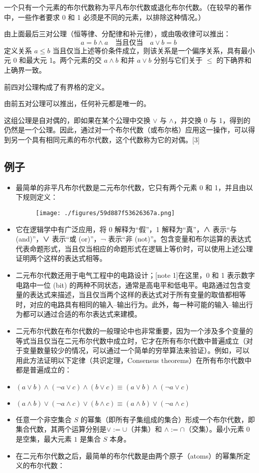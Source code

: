 一个只有一个元素的布尔代数称为平凡布尔代数或退化布尔代数。（在较早的著作中，一些作者要求 0 和 1 必须是不同的元素，以排除这种情况。）

由上面最后三对公理（恒等律、分配律和补元律），或由吸收律可以推出：
$$
a = b \land a \quad \text{当且仅当} \quad a \lor b = b~
$$
定义关系 $a \le b$ 当且仅当上述等价条件成立，则该关系是一个偏序关系，具有最小元 0 和最大元 1。两个元素的交 $a \land b$ 和并 $a \lor b$ 分别与它们关于 $\le$ 的下确界和上确界一致。

前四对公理构成了有界格的定义。

由前五对公理可以推出，任何补元都是唯一的。

这组公理是自对偶的，即如果在某个公理中交换 $\lor$ 与 $\land$，并交换 0 与 1，得到的仍然是一个公理。因此，通过对一个布尔代数（或布尔格）应用这一操作，可以得到另一个具有相同元素的布尔代数，这个代数称为它的对偶。[3]
\subsection{例子}
\begin{itemize}
\item 最简单的非平凡布尔代数是二元布尔代数，它只有两个元素 0 和 1，并且由以下规则定义：
\begin{figure}[ht]
\centering
\texttt{[image: ./figures/59d887f53626367a.png]}
\caption{} \label{fig_BRds_2}
\end{figure}
\item 它在逻辑学中有广泛应用，将 0 解释为“假”，1 解释为“真”，∧ 表示“与 (and)”，∨ 表示“或 (or)”，¬ 表示“非 (not)”。包含变量和布尔运算的表达式代表命题形式，当且仅当相应的命题形式在逻辑上等价时，可以使用上述公理证明两个这样的表达式相等。
\item 二元布尔代数还用于电气工程中的电路设计；[note 1]在这里，0 和 1 表示数字电路中一位 (bit) 的两种不同状态，通常是高电平和低电平。电路通过包含变量的表达式来描述，当且仅当两个这样的表达式对于所有变量的取值都相等时，对应的电路具有相同的输入–输出行为。此外，每一种可能的输入–输出行为都可以通过合适的布尔表达式来建模。

\item 二元布尔代数在布尔代数的一般理论中也非常重要，因为一个涉及多个变量的等式当且仅当在二元布尔代数中成立时，它才在所有布尔代数中普遍成立（对于变量数量较少的情况，可以通过一个简单的穷举算法来验证）。例如，可以用此方法证明以下定律（共识定理，Consensus theorems）在所有布尔代数中都是普遍成立的：
\item $(a \lor b) \land (\lnot a \lor c) \land (b \lor c) \equiv (a \lor b) \land (\lnot a \lor c)$
\item $(a \land b) \lor (\lnot a \land c) \lor (b \land c) \equiv (a \land b) \lor (\lnot a \land c)$
\item 任意一个非空集合 $S$ 的幂集（即所有子集组成的集合）形成一个布尔代数，即集合代数，其两个运算分别是$\lor := \cup$（并集）和 $\land := \cap$（交集）。最小元素 $0$ 是空集，最大元素 $1$ 是集合 $S$ 本身。
\item 在二元布尔代数之后，最简单的布尔代数是由两个原子（atoms）的幂集所定义的布尔代数：

\end{itemize}